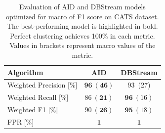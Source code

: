 \documentclass{article}
\begin{document}
\begin{enumerate}
        \begin{table}[htbp]
          \caption{Evaluation of AID and DBStream models optimized for macro of F1 score on CATS dataset. The best-performing model is highlighted in bold. Perfect clustering achieves 100\% in each metric. Values in brackets represent macro values of the metric.}
          \begin{center}
            \label{tab:perf_comp_multiclass}
            \begin{tabular}{|l|c|c|}
              \hline
              \textbf{Algorithm}        & AID                                 & DBStream               \\
              \hline
              Weighted Precision [$\%$] & $\boldsymbol{96}~(\boldsymbol{46})$ & 93~(27)                \\
              \hline
              Weighted Recall [$\%$]    & $86~(\boldsymbol{21})$              & $\boldsymbol{96}~(16)$ \\
              \hline
              Weighted F1 [$\%$]        & $90~(\boldsymbol{26})$              & $\boldsymbol{95}~(18)$ \\
              \hline
              FPR [$\%$]                & $\boldsymbol{1}$                    & $\boldsymbol{1}$       \\
              \hline
            \end{tabular}
          \end{center}
        \end{table}


\end{enumerate}
\end{document}
